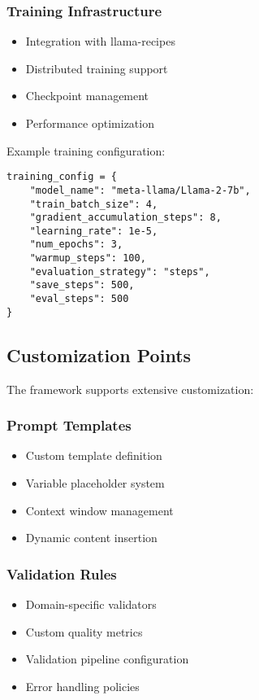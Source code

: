 \documentclass[10pt,conference]{IEEEtran}
\begin{document}
\subsubsection{Training Infrastructure}
\begin{itemize}
    \item Integration with llama-recipes
    \item Distributed training support
    \item Checkpoint management
    \item Performance optimization
\end{itemize}

Example training configuration:
\begin{lstlisting}
training_config = {
    "model_name": "meta-llama/Llama-2-7b",
    "train_batch_size": 4,
    "gradient_accumulation_steps": 8,
    "learning_rate": 1e-5,
    "num_epochs": 3,
    "warmup_steps": 100,
    "evaluation_strategy": "steps",
    "save_steps": 500,
    "eval_steps": 500
}
\end{lstlisting}

\subsection{Customization Points}
The framework supports extensive customization:

\subsubsection{Prompt Templates}
\begin{itemize}
    \item Custom template definition
    \item Variable placeholder system
    \item Context window management
    \item Dynamic content insertion
\end{itemize}

\subsubsection{Validation Rules}
\begin{itemize}
    \item Domain-specific validators
    \item Custom quality metrics
    \item Validation pipeline configuration
    \item Error handling policies
\end{itemize}
\end{document}
